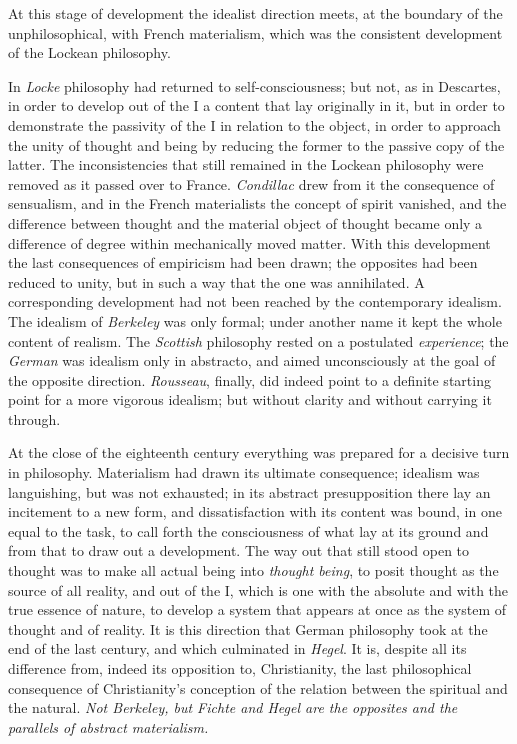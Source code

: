 \documentclass[12pt,a4paper,openany]{book}
\newcommand{\opage}[1]{\marginnote{\footnotesize\textit{[#1]}}}
\begin{document}
At this stage of development the idealist direction meets, at the
boundary of the unphilosophical, with French materialism, which was the
consistent development of the Lockean philosophy.

In \emph{Locke} philosophy had returned to self-consciousness; but not,
as in Descartes, in order to develop out of the I a content that lay
originally in it, but in order to demonstrate the passivity of the I in
relation to the object, in order to approach the unity of thought and
being by reducing the former to the passive copy of the latter. The
inconsistencies that still remained in the Lockean philosophy were
removed as it passed over to France. \emph{Condillac} drew from it the
consequence of sensualism, and in the French materialists the concept
of spirit vanished, and the difference between thought and the material
object of thought became only a difference of degree within mechanically
moved matter. With this development the last consequences of empiricism
had been drawn; the opposites had been reduced to unity, but in such a
way that the one was annihilated. A corresponding
\opage{10}development had not been reached by the contemporary idealism.
The idealism of \emph{Berkeley} was only formal; under another name it
kept the whole content of realism. The \emph{Scottish} philosophy rested
on a postulated \emph{experience}; the \emph{German} was idealism only
in abstracto, and aimed unconsciously at the goal of the opposite
direction. \emph{Rousseau}, finally, did indeed point to a definite
starting point for a more vigorous idealism; but without clarity and
without carrying it through.

At the close of the eighteenth century everything was prepared for a
decisive turn in philosophy. Materialism had drawn its ultimate
consequence; idealism was languishing, but was not exhausted; in its
abstract presupposition there lay an incitement to a new form, and
dissatisfaction with its content was bound, in one equal to the task, to
call forth the consciousness of what lay at its ground and from that to
draw out a development. The way out that still stood open to thought was
to make all actual being into \emph{thought being}, to posit thought as
the source of all reality, and out of the I, which is one with the
absolute and with the true essence of nature, to develop a system that
appears at once as the system of thought and of reality. It is this
direction that German philosophy took at the end of the last century,
and which culminated in \emph{Hegel}. It is, despite all its difference
from, indeed its opposition to, Christianity, the last philosophical
consequence of Christianity's conception of the relation between the
spiritual and the natural. \emph{Not Berkeley, but Fichte and Hegel are
the opposites and the parallels of abstract materialism.}
\end{document}
